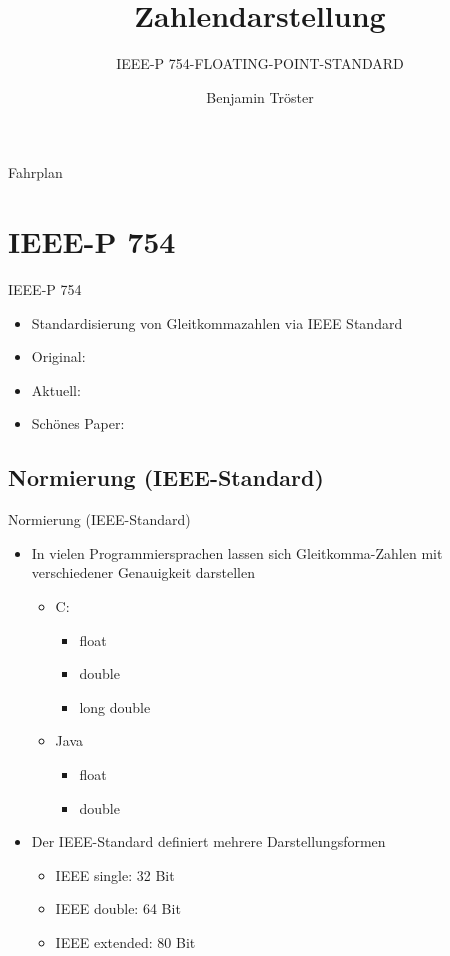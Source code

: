 \documentclass[12pt%
,xcolor=table
,aspectratio=169%
]{beamer}
\author{Benjamin Tröster}
\title[Zahlendarstellung]{Zahlendarstellung}
\subtitle[IEEE-P 754-FLOATING-POINT-STANDARD]{IEEE-P 754-FLOATING-POINT-STANDARD}
\institute[HTW Berlin]{Hochschule für Technik und Wirtschaft Berlin}
\begin{document}
\begin{frame}
\titlepage
\end{frame}

\begin{frame}{Fahrplan}
\tableofcontents[hideothersubsections]
\end{frame}

\section{IEEE-P 754}
\begin{frame}{IEEE-P 754}
\begin{itemize}
	\item Standardisierung von Gleitkommazahlen via IEEE Standard
	\item Original: \cite{IEEE754Original}
	\item Aktuell: \cite{cornea2009ieee}
	\item Schönes Paper: \cite{goldberg1991every}
\end{itemize}
\end{frame}

\subsection{Normierung (IEEE-Standard)}
\begin{frame}{Normierung (IEEE-Standard)}
\begin{itemize}
	\item In vielen Programmiersprachen lassen sich Gleitkomma-Zahlen mit verschiedener Genauigkeit darstellen
	\begin{itemize}
		\item C:
		\begin{itemize}
			\item float
			\item double
			\item long double
		\end{itemize}
		\item Java
		\begin{itemize}
			\item float
			\item double
		\end{itemize}
	\end{itemize}
	\item Der IEEE-Standard definiert mehrere Darstellungsformen
	\begin{itemize}
		\item IEEE single: 32 Bit
		\item IEEE double: 64 Bit
		\item IEEE extended: 80 Bit
	\end{itemize}
\end{itemize}
\end{frame}
\end{document}
